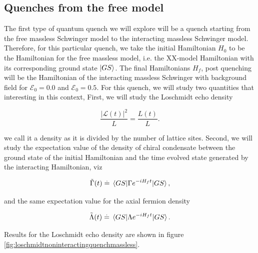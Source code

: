 \subsection{Quenches from the free model}

The first type of quantum quench we will explore will be a quench starting from the free massless Schwinger model to the interacting massless Schwinger model. Therefore, for this particular quench, we take the initial Hamiltonian $H_0$ to be the Hamiltonian for the free massless model, i.e. the XX-model Hamiltonian with its corresponding ground state $\ket{GS}$.  The final Hamiltonians $H_f$, post quenching will be the Hamiltonian of the interacting massless Schwinger with background field for $\mathcal{E}_0=0.0$ and $\mathcal{E}_0=0.5$. For this quench, we will study two quantities that interesting in this context, First, we will study the Loschmidt echo density

\begin{equation}
\frac{|\mathcal{L}(t)|^2}{L} = \frac{L(t)}{L}.
\end{equation}

we call it a density as it is divided by the number of lattice sites. Second, we will study the expectation value of the density of chiral condensate between the ground state of the initial Hamiltonian and the time evolved state generated by the interacting Hamiltonian, viz

\begin{equation}
\tilde{\Gamma}(t)\overset{.}{=} \ev{\Gamma e^{-iH_f t}}{GS},
\end{equation}

and the same expectation value for the axial fermion density

\begin{equation}
\tilde{\Lambda}(t)\overset{.}{=} \ev{\Lambda e^{-iH_f t}}{GS}.
\end{equation}

Results for the Loschmidt echo density are shown in figure \ref{fig:loschmidtnoninteractingquenchmassless}.

